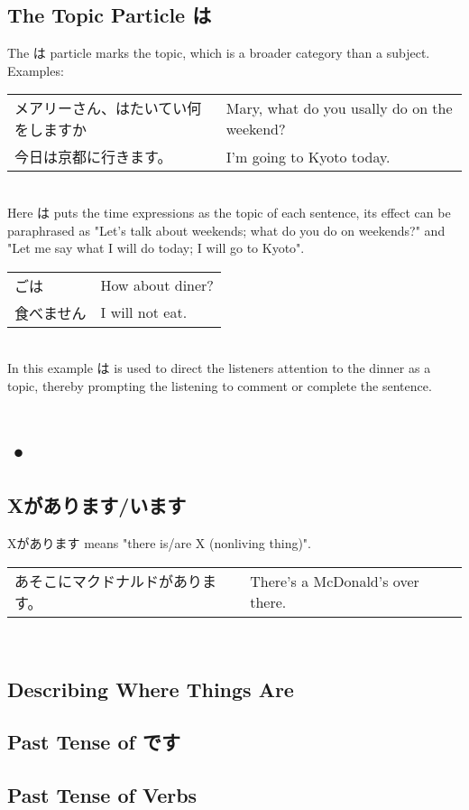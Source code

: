\documentclass{article}
\newenvironment{gex}
{
	\,\\
	\renewcommand{\arraystretch}{1.5}
    \begin{tabular}{m{20em} l}
}
{
	\end{tabular}
	\renewcommand{\arraystretch}{1}
	\\
}
\begin{document}
   
   \subsection{The Topic Particle は}
   The は particle marks the topic, which is a broader category than a subject. Examples:
   \begin{gex}
   メアリーさん、\ruby{週末}{しゅうまつ}はたいてい何をしますか & Mary, what do you usally do on the weekend? \\
   今日は京都に行きます。 & I'm going to Kyoto today. 
   \end{gex}
   Here は puts the time expressions as the topic of each sentence, its effect can be paraphrased as "Let's talk about weekends; what do you do on weekends?" and "Let me say what I will do today; I will go to Kyoto".
   \begin{gex}
   \ruby{晩}{ばん}ご\ruby{飯}{はん}は & How about diner? \\
   食べません & I will not eat.
   \end{gex}
   In this example は is used to direct the listeners attention to the dinner as a topic, thereby prompting the listening to comment or complete the sentence. 
   
   
   \newpage
   
   \section{•}
   \subsection{Xがあります/います}
   Xがあります means "there is/are X (nonliving thing)". 
   \begin{gex}
   あそこにマクドナルドがあります。 & There's a McDonald's over there.
   \end{gex}
   
   
   
   \subsection{Describing Where Things Are}
   \subsection{Past Tense of です}
   \subsection{Past Tense of Verbs}
\end{document}
